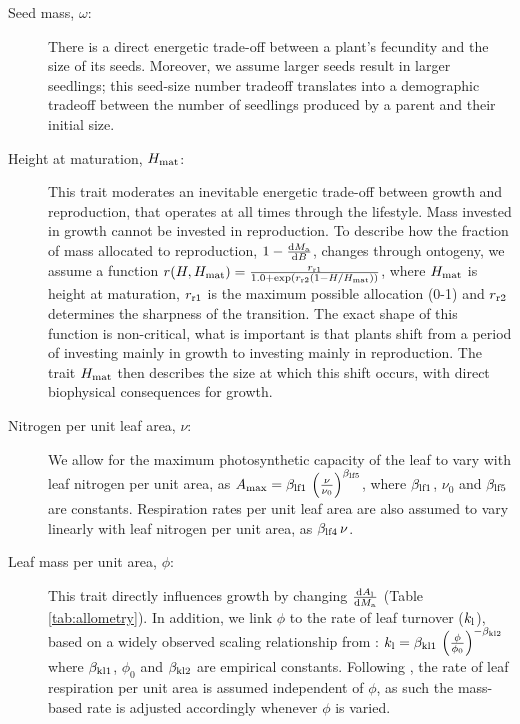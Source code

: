 \documentclass[a4paper,11pt]{article}
\begin{document}
\begin{description}
\item[Seed mass, $\omega$:] There is a direct energetic trade-off between a plant's fecundity and the size of its seeds. Moreover, we assume larger seeds result in larger seedlings; this seed-size number tradeoff translates into a demographic tradeoff between the number of seedlings produced by a parent and their initial size.
\item[Height at maturation, $H_{{\rm mat}}$:] This trait moderates an inevitable energetic trade-off between growth and reproduction, that operates at all times through the lifestyle. Mass invested in growth cannot be invested in reproduction. To describe how the fraction of mass allocated to reproduction, $1- \frac{{\rm d}M_{{\rm a}}}{{\rm d}B}$, changes through ontogeny, we assume a function $r(H, H_{{\rm mat}}) = \frac{r_{\rm r1}} {1.0 + \exp\left(r_{\rm r2} \left(1 - H / H_{{\rm mat}}\right)\right)}$, where $H_{{\rm mat}}$ is height at maturation, $r_{\rm r1}$ is the maximum possible allocation (0-1) and $r_{\rm r2}$ determines the sharpness of the transition. The exact shape of this function is non-critical, what is important is that plants shift from a period of investing mainly in growth to investing mainly in reproduction. The trait $H_{{\rm mat}}$ then describes the size at which this shift occurs, with direct biophysical consequences for growth.
\item[Nitrogen per unit leaf area,  $\nu$:] We allow for the maximum photosynthetic capacity of the leaf to vary with leaf nitrogen per unit area, as $A_{\rm max} = \beta_{{\rm lf1}} \, \left(\frac{\nu}{\nu_0}\right)^{\beta_{{\rm lf5}}}$, where $\beta_{{\rm lf1}}$, $\nu_0$ and $\beta_{{\rm lf5}}$ are constants. Respiration rates per unit leaf area are also assumed to vary linearly with leaf nitrogen per unit area, as $\beta_{{\rm lf4}}\, \nu$.
\item[Leaf mass per unit area, $\phi$:] This trait directly influences growth by changing $\frac{{\rm d}A_{\rm l}}{{\rm d}M_{\rm a}}$ (Table \ref{tab:allometry}). In addition, we link $\phi$ to the rate of leaf turnover ($k_{\rm l}$), based on a widely observed scaling relationship from \citet{Wright-2004}: $k_{\rm l} = \beta_{{\rm kl1}} \, \left(\frac{\phi}{\phi_0}\right)^{-\beta_{{\rm kl2}}}$ where $\beta_{{\rm kl1}}$, $\phi_0$ and $\beta_{{\rm kl2}}$ are empirical constants. Following \citet{Wright-2004}, the rate of leaf respiration per unit area is assumed independent of $\phi$, as such the mass-based rate is adjusted accordingly whenever $\phi$ is varied.

\end{description}
\end{document}
